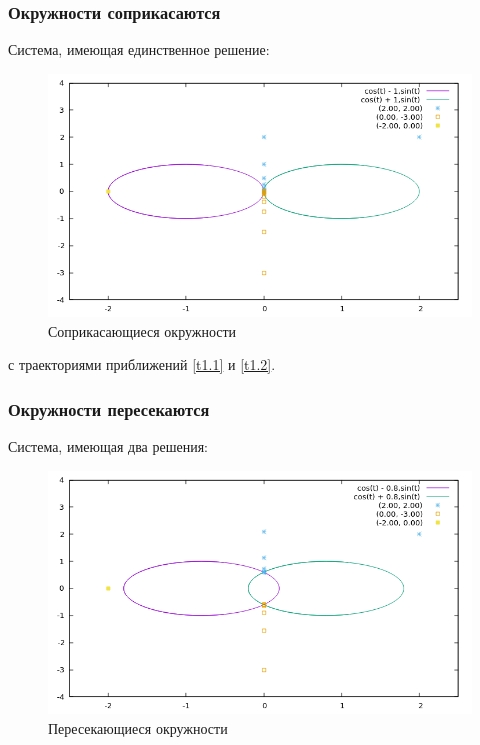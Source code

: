 \documentclass[12pt, a4paper]{article}
\begin{document}
\subsubsection{Окружности соприкасаются}
\noindent Система, имеющая единственное решение:

\vspace{5mm}
\begin{figure}[H]
\centering
\includegraphics[scale=0.8]{1.png}
\caption{Соприкасающиеся окружности}
\end{figure}
\vspace{5mm}

\noindent с траекториями приближений \ref{t1.1} и \ref{t1.2}.

\subsubsection{Окружности пересекаются}
\noindent Система, имеющая два решения:

\vspace{5mm}
\begin{figure}[H]
\centering
\includegraphics[scale=0.8]{2.png}
\caption{Пересекающиеся окружности}
\end{figure}
\vspace{5mm}
\end{document}
